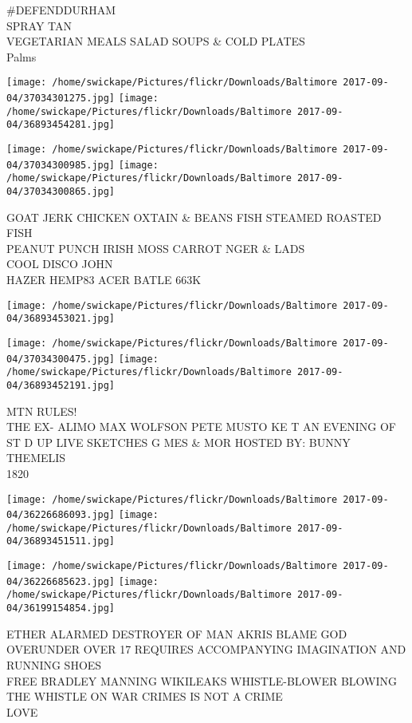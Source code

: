 \documentclass[10pt,letterpaper]{article}
\begin{document}
\#DEFENDDURHAM\\
SPRAY TAN\\
VEGETARIAN MEALS SALAD SOUPS \& COLD PLATES\\
Palms
\pagebreak

\texttt{[image: /home/swickape/Pictures/flickr/Downloads/Baltimore 2017-09-04/37034301275.jpg]}
\texttt{[image: /home/swickape/Pictures/flickr/Downloads/Baltimore 2017-09-04/36893454281.jpg]}

\texttt{[image: /home/swickape/Pictures/flickr/Downloads/Baltimore 2017-09-04/37034300985.jpg]}
\texttt{[image: /home/swickape/Pictures/flickr/Downloads/Baltimore 2017-09-04/37034300865.jpg]}

GOAT JERK CHICKEN OXTAIN \& BEANS FISH STEAMED ROASTED FISH\\
PEANUT PUNCH IRISH MOSS CARROT NGER \& LADS\\
COOL DISCO JOHN\\
HAZER HEMP83 ACER BATLE 663K
\pagebreak

\texttt{[image: /home/swickape/Pictures/flickr/Downloads/Baltimore 2017-09-04/36893453021.jpg]}

\vspace{0.25in}
\texttt{[image: /home/swickape/Pictures/flickr/Downloads/Baltimore 2017-09-04/37034300475.jpg]}
\texttt{[image: /home/swickape/Pictures/flickr/Downloads/Baltimore 2017-09-04/36893452191.jpg]}

MTN RULES!\\
THE EX{-} ALIMO MAX WOLFSON PETE MUSTO KE T AN EVENING OF ST D UP LIVE SKETCHES G MES \& MOR HOSTED BY: BUNNY THEMELIS\\
1820
\pagebreak

\texttt{[image: /home/swickape/Pictures/flickr/Downloads/Baltimore 2017-09-04/36226686093.jpg]}
\texttt{[image: /home/swickape/Pictures/flickr/Downloads/Baltimore 2017-09-04/36893451511.jpg]}

\texttt{[image: /home/swickape/Pictures/flickr/Downloads/Baltimore 2017-09-04/36226685623.jpg]}
\texttt{[image: /home/swickape/Pictures/flickr/Downloads/Baltimore 2017-09-04/36199154854.jpg]}

ETHER ALARMED DESTROYER OF MAN AKRIS BLAME GOD\\
OVERUNDER OVER 17 REQUIRES ACCOMPANYING IMAGINATION AND RUNNING SHOES\\
FREE BRADLEY MANNING WIKILEAKS WHISTLE{-}BLOWER BLOWING THE WHISTLE ON WAR CRIMES IS NOT A CRIME\\
LOVE
\pagebreak
\end{document}
